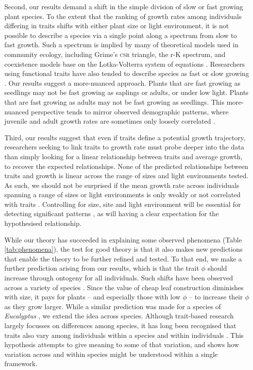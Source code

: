 \documentclass[9pt,twocolumn,twoside]{pnas-new}
\begin{document}
Second, our results demand a shift in the simple division of slow or fast growing plant species. To the extent that the ranking of growth rates among individuals differing in traits shifts with either plant size or light environment, it is not possible to describe a species via a single point along a spectrum from slow to fast growth. Such a spectrum is implied by many of theoretical models used in community ecology, including Grime's \textsc{csr} triangle, the r-K spectrum, and coexistence models base on the Lotka-Volterra system of equations \citep[e.g.][]{Grime-1977,Chesson-2000}. Researchers using functional traits have also tended to describe species as fast or slow growing \citep[e.g.][]{Adler-2014, Diaz-2016}. Our results suggest a more-nuanced approach. Plants that are fast growing as seedlings may not be fast growing as saplings or adults, or under low light. Plants that are fast growing as adults may not be fast growing as seedlings. This more-nuanced perspective tends to mirror observed demographic patterns, where juvenile and adult growth rates are sometimes only loosely correlated \citep{Rees-2001}.

Third, our results suggest that even if traits define a potential growth trajectory, researchers seeking to link traits to growth rate must probe deeper into the data than simply looking for a linear relationship between traits and average growth, to recover the expected relationships. None of the predicted relationships between traits and growth is linear across the range of sizes and light environments tested. As such, we should not be surprised if the mean growth rate across individuals spanning a range of sizes or light environments is only weakly or not correlated with traits \citep[e.g.][]{Poorter-2008,Paine-2015}. Controlling for size, site and light environment will be essential for detecting significant patterns \citep[e.g.][]{Gibert-2016}, as will having a clear expectation for the hypothesised relationship.

While our theory has succeeded in explaining some observed phenomena (Table \ref{tab:phenomena}), the test for good theory is that it also makes new predictions that enable the theory to be further refined and tested. To that end, we make a further prediction arising from our results, which is that the trait $\phi$ should increase through ontogeny for all individuals. Such shifts have been observed across a variety of species \citep{King-1999,Thomas-1999,Koch-2004}. Since the value of cheap leaf construction diminishes with size, it pays for plants -- and especially those with low $\phi$ -- to increase their $\phi$ as they grow larger. While a similar prediction was made for a species of \emph{Eucalyptus} \citep{King-1999}, we extend the idea across species. Although trait-based research largely focusses on differences among species, it has long been recognised that traits also vary among individuals within a species and within individuals \citep{Westoby-2002}. This hypothesis attempts to give meaning to some of that variation, and shows how variation across and within species might be understood within a single framework.
\end{document}

